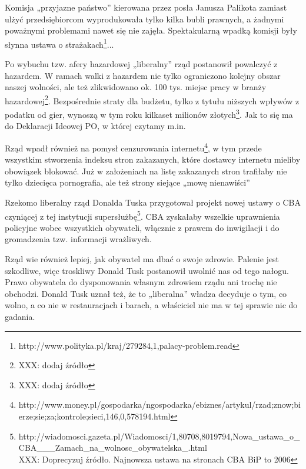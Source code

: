 \documentclass[10pt]{article}
\begin{document}
Komisja „przyjazne państwo” kierowana przez posła Janusza Palikota zamiast ulżyć przedsiębiorcom wyprodukowała tylko kilka bubli prawnych, a żadnymi poważnymi problemami nawet się nie zajęła. Spektakularną wpadką komisji były słynna ustawa o strażakach\footnote{http://www.polityka.pl/kraj/279284,1,palacy-problem.read}...

Po wybuchu tzw. afery hazardowej „liberalny” rząd postanowił powalczyć z hazardem. W ramach walki z hazardem nie tylko ograniczono kolejny obszar naszej wolności, ale też zlikwidowano ok. 100 tys. miejsc pracy w branży hazardowej\footnote{XXX: dodaj źródło}. Bezpośrednie straty dla budżetu, tylko z tytułu niższych wpływów z podatku od gier, wynoszą w tym roku kilkaset milionów złotych\footnote{XXX: dodaj źródło}. Jak to się ma do Deklaracji Ideowej PO, w której czytamy m.in.


Rząd wpadł również na pomysł cenzurowania internetu\footnote{http://www.money.pl/gospodarka/ngospodarka/ebiznes/artykul/rzad;znow;bierze;sie;za;kontrole;sieci,146,0,578194.html}, w tym przede wszystkim stworzenia indeksu stron zakazanych, które dostawcy internetu mieliby obowiązek blokować. Już w założeniach na listę zakazanych stron trafiłaby nie tylko dziecięca pornografia, ale też strony siejące „mowę nienawiści”

Rzekomo liberalny rząd Donalda Tuska przygotował projekt nowej ustawy o CBA czyniącej z tej instytucji supersłużbę\footnote{http://wiadomosci.gazeta.pl/Wiadomosci/1,80708,8019794,Nowa\_ustawa\_o\_CBA\_\_\_Zamach\_na\_wolnosc\_obywatelska\_.html\\XXX: Doprecyzuj źródło. Najnowsza ustawa na stronach CBA BiP to 2006}. CBA zyskałaby wszelkie uprawnienia policyjne wobec wszystkich obywateli, włącznie z prawem do inwigilacji i do gromadzenia tzw. informacji wrażliwych.

Rząd wie również lepiej, jak obywatel ma dbać o swoje zdrowie. Palenie jest szkodliwe, więc troskliwy Donald Tusk postanowił uwolnić nas od tego nałogu. Prawo obywatela do dysponowania własnym zdrowiem rządu ani trochę nie obchodzi. Donald Tusk uznał też, że to „liberalna” władza decyduje o tym, co wolno, a co nie w restauracjach i barach, a właściciel nie ma w tej sprawie nic do gadania. 
\end{document}

